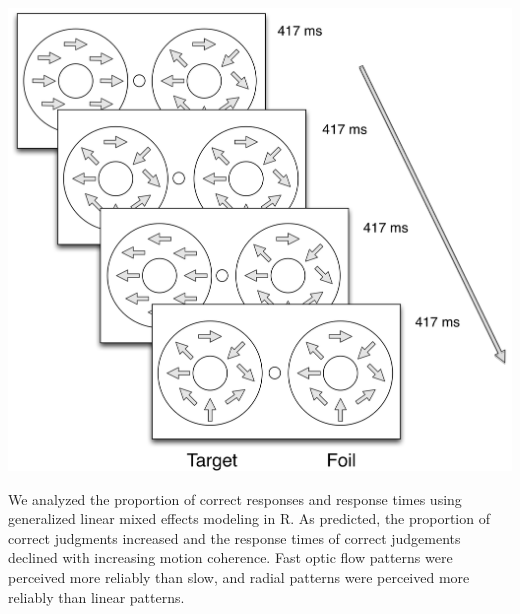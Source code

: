 \documentclass[landscape,final,a0paper,fontscale=0.285]{baposter}
\begin{document}
\begin{poster}
    {
      \vspace{3em}
      \includegraphics[scale=0.30]{img/optic-flow-psychophysics-display.png}
      \vspace{4em}
    }


    {
      \smaller
          \renewcommand{\refname}{\vspace{-0.5em}} %
          
          
     \vspace{0.3em}
    }

    {
      We analyzed the proportion of correct responses and response times using generalized linear mixed effects modeling in R. As predicted, the proportion of correct judgments increased and the response times of correct judgements declined with increasing motion coherence. Fast optic flow patterns were perceived more reliably than slow, and radial patterns were perceived more reliably than linear patterns.
      
}
\end{poster}
\end{document}
